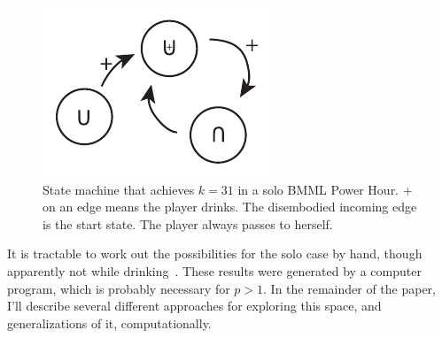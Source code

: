 \documentclass[twocolumn]{article}
\begin{document}
\begin{figure}[ht]
\begin{center}
\includegraphics[width=0.90 \linewidth]{solo31.pdf}
\end{center}\vspace{-0.1in}
\caption{State machine that achieves $k=31$ in a solo BMML Power Hour.
  $+$ on an edge means the player drinks. The disembodied incoming
  edge is the start state. The player always passes to herself.}
\label{fig:solo31}
\end{figure}

It is tractable to work out the possibilities for the solo case by
hand, though apparently not while drinking~\cite{algorithms}. These
results were generated by a computer program, which is probably
necessary for $p>1$. In the remainder of the paper, I'll describe
several different approaches for exploring this space, and
generalizations of it, computationally.
\end{document}
